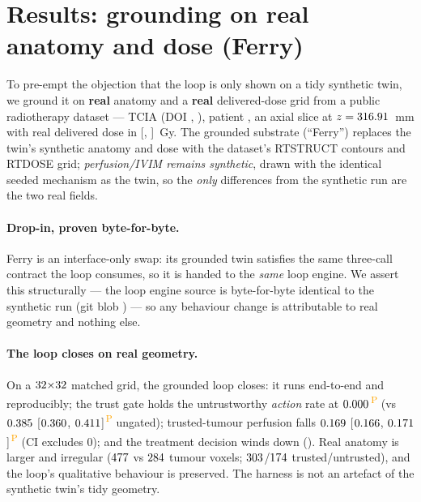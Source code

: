 \documentclass[12pt]{iopart}
\newcommand{\PROV}{\textsuperscript{\textcolor{orange}{\,P}}}
\begin{document}
\section{Results: grounding on real anatomy and dose (Ferry)}\label{sec:ferry}
To pre-empt the objection that the loop is only shown on a tidy synthetic twin, we ground
it on \textbf{real} anatomy and a \textbf{real} delivered-dose grid from a public
radiotherapy dataset --- TCIA \numFerryDataset{} (DOI \texttt{\numFerryDOI},
\numFerryLicense), patient \texttt{\numFerryPatient}, an axial slice at $z=316.91$~mm
with real delivered dose in [\numFerryDoseLo, \numFerryDoseHi]~Gy. The grounded substrate
(``Ferry'') replaces the twin's synthetic anatomy and dose with the dataset's RTSTRUCT
contours and RTDOSE grid; \emph{perfusion/IVIM remains synthetic}, drawn with the
identical seeded mechanism as the twin, so the \emph{only} differences from the synthetic
run are the two real fields.

\paragraph{Drop-in, proven byte-for-byte.} Ferry is an interface-only swap: its grounded
twin satisfies the same three-call contract the loop consumes, so it is handed to the
\emph{same} loop engine. We assert this structurally --- the loop engine source is
byte-for-byte identical to the synthetic run (git blob \texttt{\numLoopBlob}) --- so any
behaviour change is attributable to real geometry and nothing else.

\paragraph{The loop closes on real geometry.} On a $32{\times}32$
matched grid, the grounded loop closes: it runs end-to-end and reproducibly; the trust
gate holds the untrustworthy \emph{action} rate at $0.000$\PROV{} (vs
$0.385$ [$0.360$, $0.411$]\PROV{} ungated); trusted-tumour
perfusion falls $0.169$ [$0.166$, $0.171$]\PROV{} (CI excludes
0); and the treatment decision winds down (\numGTreatTraj). Real anatomy is larger and
irregular ($477$ vs $284$ tumour voxels;
$303$/$174$ trusted/untrusted), and the loop's qualitative behaviour is
preserved. The harness is not an artefact of the synthetic twin's tidy geometry.
\end{document}
